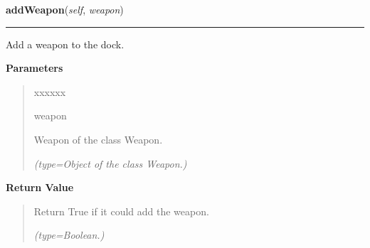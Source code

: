 \hspace{.8\funcindent}\begin{boxedminipage}{\funcwidth}

    \raggedright \textbf{addWeapon}(\textit{self}, \textit{weapon})

    \vspace{-1.5ex}

    \rule{\textwidth}{0.5\fboxrule}
\setlength{\parskip}{2ex}
    Add a weapon to the dock.

\setlength{\parskip}{1ex}
      \textbf{Parameters}
      \vspace{-1ex}

      \begin{quote}
        \begin{Ventry}{xxxxxx}

          \item[weapon]

          Weapon of the class Weapon.

            {\it (type=Object of the class Weapon.)}

        \end{Ventry}

      \end{quote}

      \textbf{Return Value}
    \vspace{-1ex}

      \begin{quote}
      Return True if it could add the weapon.

      {\it (type=Boolean.)}

      \end{quote}

    \end{boxedminipage}

    \label{systems:WeaponControl:powerWeapon}

    \vspace{0.5ex}

